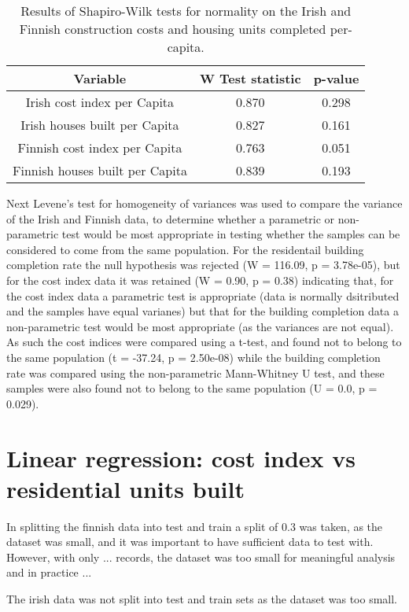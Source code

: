 \documentclass[hidelinks,12pt,oneside]{report} %
\begin{document}
\begin{table}[h!]
\centering
\begin{tabular}{||c | c | c ||} 
 \hline
 Variable & W Test statistic & p-value \\ [0.0ex] 
 \hline\hline
 Irish cost index per Capita & 0.870 & 0.298 \\ 
 \hline
 Irish houses built per Capita & 0.827 & 0.161 \\
 \hline
 Finnish cost index per Capita & 0.763 & 0.051 \\
 \hline
  Finnish houses built per Capita & 0.839 & 0.193 \\ [0.0ex] 
 \hline
\end{tabular}
\caption{Results of Shapiro-Wilk tests for normality on the Irish and Finnish construction costs and housing units completed per-capita.}
\label{table:2}
\end{table}
 
Next Levene's test for homogeneity of variances was used to compare the variance of the Irish and Finnish data, to determine whether a parametric or non-parametric test would be most appropriate in testing whether the samples can be considered to come from the same population. For the residentail building completion rate the null hypothesis was rejected (W = 116.09, p = 3.78e-05), but for the cost index data it was retained (W = 0.90, p = 0.38) indicating that, for the cost index data a parametric test is appropriate (data is normally dsitributed and the samples have equal varianes) but that for the building completion data a non-parametric test would be most appropriate (as the variances are not equal). As such the cost indices were compared using a t-test, and found not to belong to the same population (t = -37.24, p = 2.50e-08) while the building completion rate was compared using the non-parametric Mann-Whitney U test, and these samples were also found not to belong to the same population (U = 0.0, p = 0.029).

\section{Linear regression: cost index vs residential units built}
In splitting the finnish data into test and train a split of 0.3 was taken, as the dataset was small, and it was important to have sufficient data to test with. However, with only ... records, the dataset was too small for meaningful analysis and in practice ...

The irish data was not split into test and train sets as the dataset was too small.
\end{document}
